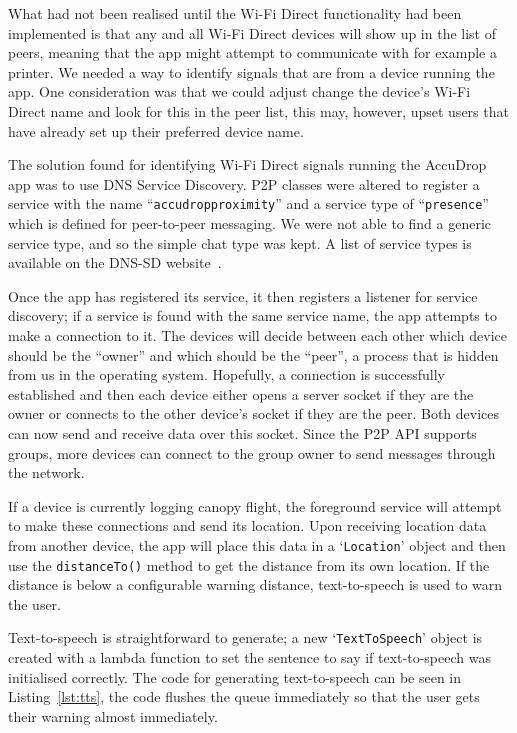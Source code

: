 What had not been realised until the Wi-Fi Direct functionality had been implemented is that any and all Wi-Fi Direct devices will show up in the list of peers, meaning that the app might attempt to communicate with for example a printer. We needed a way to identify signals that are from a device running the app. One consideration was that we could adjust change the device's Wi-Fi Direct name and look for this in the peer list, this may, however, upset users that have already set up their preferred device name.

The solution found for identifying Wi-Fi Direct signals running the AccuDrop app was to use DNS Service Discovery. P2P classes were altered to register a service with the name ``\texttt{accudropproximity}'' and a service type of ``\texttt{presence}'' which is defined for peer-to-peer messaging. We were not able to find a generic service type, and so the simple chat type was kept. A list of service types is available on the DNS-SD website~\cite{_dns_????}.

Once the app has registered its service, it then registers a listener for service discovery; if a service is found with the same service name, the app attempts to make a connection to it. The devices will decide between each other which device should be the ``owner'' and which should be the ``peer'', a process that is hidden from us in the operating system. Hopefully, a connection is successfully established and then each device either opens a server socket if they are the owner or connects to the other device's socket if they are the peer. Both devices can now send and receive data over this socket. Since the P2P API supports groups, more devices can connect to the group owner to send messages through the network.

If a device is currently logging canopy flight, the foreground service will attempt to make these connections and send its location. Upon receiving location data from another device, the app will place this data in a `\texttt{Location}' object and then use the \texttt{distanceTo()} method to get the distance from its own location. If the distance is below a configurable warning distance, text-to-speech is used to warn the user.

Text-to-speech is straightforward to generate; a new `\texttt{TextToSpeech}' object is created with a lambda function to set the sentence to say if text-to-speech was initialised correctly. The code for generating text-to-speech can be seen in Listing~\vref{lst:tts}, the code flushes the queue immediately so that the user gets their warning almost immediately.

